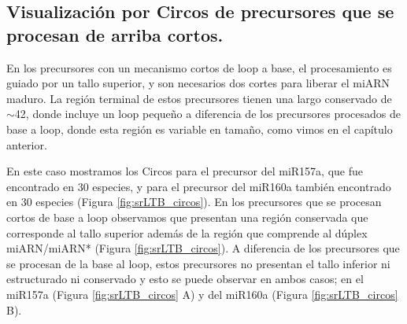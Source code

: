 \subsection{Visualización por Circos de precursores que se procesan de arriba cortos.}

En los precursores con un mecanismo cortos de loop a base, el procesamiento es guiado por un tallo superior, y son necesarios dos cortes para liberar el miARN maduro.
La región terminal de estos precursores tienen una largo conservado de $\sim$42, donde incluye un loop pequeño \citep{Bologna2013} a diferencia de los precursores procesados de base a loop, donde esta región es variable en tamaño, como vimos en el capítulo anterior.

En este caso mostramos los Circos para el precursor del miR157a, que fue encontrado en 30 especies, y para el precursor del miR160a también encontrado en 30 especies (Figura \ref{fig:srLTB_circos}). 
En los precursores que se procesan cortos de base a loop observamos que presentan una región conservada que corresponde al tallo superior además de la región que comprende al dúplex miARN/miARN* (Figura \ref{fig:srLTB_circos}).
A diferencia de los precursores que se procesan de la base al loop, estos precursores no presentan el tallo inferior ni estructurado ni conservado y esto se puede observar en ambos casos; en el miR157a (Figura \ref{fig:srLTB_circos} A) y del miR160a (Figura \ref{fig:srLTB_circos} B).





